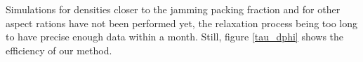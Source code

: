 \documentclass[class=report, float=false, crop=false]{standalone}
\begin{document}
Simulations for densities closer to the jamming packing fraction and for other aspect rations have not been performed yet, the relaxation process being too long to have precise enough data within a month. Still, figure \ref{tau_dphi} shows the efficiency of our method.







% 
\end{document}
